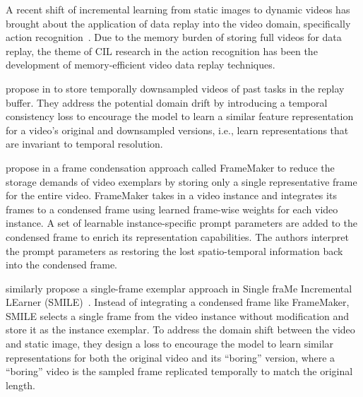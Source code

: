 A recent shift of incremental learning from static images to dynamic videos has brought about the application of data replay into the video domain, specifically action recognition~\cite{villa2022vclimb,alssum2023just,park2021class,pei2022learning}. Due to the memory burden of storing full videos for data replay, the theme of CIL research in the action recognition has been the development of memory-efficient video data replay techniques. 

\citeauthor{villa2022vclimb} propose in \cite{villa2022vclimb} to store temporally downsampled videos of past tasks in the replay buffer. They address the potential domain drift by introducing a temporal consistency loss to encourage the model to learn a similar feature representation for a video's original and downsampled versions, i.e., learn representations that are invariant to temporal resolution.

\citeauthor{pei2022learning} propose in \cite{pei2022learning} a frame condensation approach called FrameMaker to reduce the storage demands of video exemplars by storing only a single representative frame for the entire video. FrameMaker takes in a video instance and integrates its frames to a condensed frame using learned frame-wise weights for each video instance. A set of learnable instance-specific prompt parameters are added to the condensed frame to enrich its representation capabilities. The authors interpret the prompt parameters as restoring the lost spatio-temporal information back into the condensed frame.

\citeauthor{alssum2023just} similarly propose a single-frame exemplar approach in Single fraMe Incremental LEarner (SMILE)~\cite{alssum2023just}. Instead of integrating a condensed frame like FrameMaker, SMILE selects a single frame from the video instance without modification and store it as the instance exemplar. To address the domain shift between the video and static image, they design a loss to encourage the model to learn similar representations for both the original video and its ``boring'' version, where a ``boring'' video is the sampled frame replicated temporally to match the original length.

